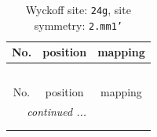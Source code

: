 \documentclass[fleqn,8pt]{jsarticle}
\begin{document}
\renewcommand{\arraystretch}{1.2}
\begin{longtable}{ccc}
\caption{Wyckoff site: {\tt 24g}, site symmetry: {\tt 2.mm1'}}
 \\
 \hline \hline
No. & position & mapping \\ \hline \endfirsthead

\multicolumn{2}{l}{\tablename\ \thetable{}} \\
 \hline \hline
No. & position & mapping \\ \hline \endhead

 \hline \hline
\multicolumn{2}{r}{\footnotesize\it continued ...} \\ \endfoot

 \hline \hline
\multicolumn{2}{r}{} \\ \endlastfoot


\end{longtable}
\end{document}
